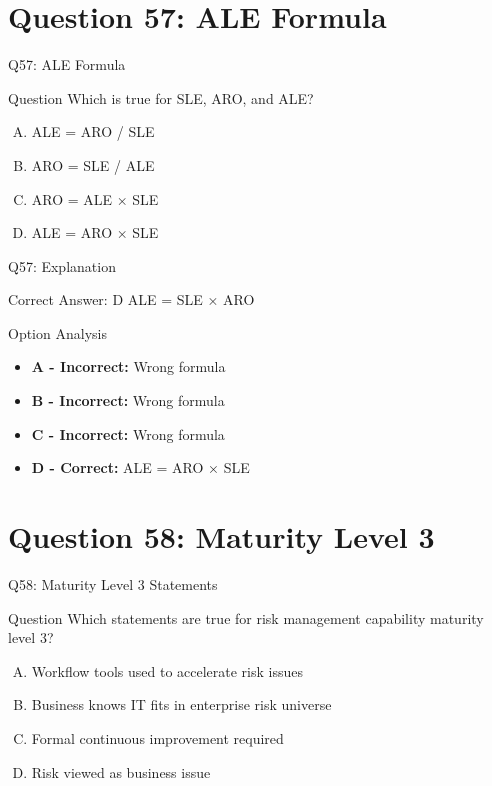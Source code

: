 \documentclass{beamer}
\begin{document}
	\section{Question 57: ALE Formula}
	
	\begin{frame}{Q57: ALE Formula}
		\begin{block}{Question}
			Which is true for SLE, ARO, and ALE?
		\end{block}
		\begin{enumerate}[(A)]
			\item ALE = ARO / SLE
			\item ARO = SLE / ALE
			\item ARO = ALE × SLE
			\item ALE = ARO × SLE
		\end{enumerate}
	\end{frame}
	
	\begin{frame}{Q57: Explanation}
		\begin{block}{Correct Answer: D}
			ALE = SLE × ARO
		\end{block}
		\begin{block}{Option Analysis}
			\begin{itemize}
				\item \textbf{A - Incorrect:} Wrong formula
				\item \textbf{B - Incorrect:} Wrong formula
				\item \textbf{C - Incorrect:} Wrong formula
				\item \textbf{D - Correct:} ALE = ARO × SLE
			\end{itemize}
		\end{block}
	\end{frame}
	
	\section{Question 58: Maturity Level 3}
	
	\begin{frame}{Q58: Maturity Level 3 Statements}
		\begin{block}{Question}
			Which statements are true for risk management capability maturity level 3?
		\end{block}
		\begin{enumerate}[(A)]
			\item Workflow tools used to accelerate risk issues
			\item Business knows IT fits in enterprise risk universe
			\item Formal continuous improvement required
			\item Risk viewed as business issue
		\end{enumerate}
	\end{frame}
	
\end{document}
